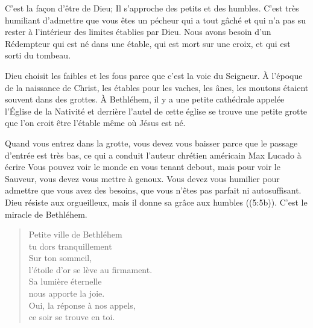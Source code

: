C'est la façon d'être de Dieu; Il s'approche des petits et des humbles. C'est très humiliant d'admettre que vous êtes un pécheur qui a tout gâché et qui n'a pas su rester à l'intérieur des limites établies par Dieu. Nous avons besoin d'un Rédempteur qui est né dans une étable, qui est mort sur une croix, et qui est sorti du tombeau.

Dieu choisit les faibles et les fous parce que c'est la voie du Seigneur. À l'époque de la naissance de Christ, les étables pour les vaches, les ânes, les moutons étaient souvent dans des grottes. À Bethléhem, il y a une petite cathédrale appelée l'Église de la Nativité et derrière l'autel de cette église se trouve une petite grotte que l'on croit être l'étable même où Jésus est né.

Quand vous entrez dans la grotte, vous devez vous baisser parce que le passage d'entrée est très bas, ce qui a conduit l'auteur chrétien américain Max Lucado à écrire\frcolon{} \Og Vous pouvez voir le monde en vous tenant debout, mais pour voir le Sauveur, vous devez vous mettre à genoux. Vous devez vous humilier pour admettre que vous avez des besoins, que vous n'êtes pas parfait ni autosuffisant. \Fg{} \Og Dieu résiste aux orgueilleux, mais il donne sa grâce aux humbles \Fg{} ((5:5b)). C'est le miracle de Bethléhem.


\ornrule

\begin{verse}
\begin{altverse}
Petite ville de Bethléhem\\
tu dors tranquillement\\
Sur ton sommeil,\\
l'étoile d'or se lève au firmament.\\
Sa lumière éternelle\\
nous apporte la joie.\\
Oui, la réponse à nos appels,\\
ce soir se trouve en toi.
\end{altverse}
\end{verse}
